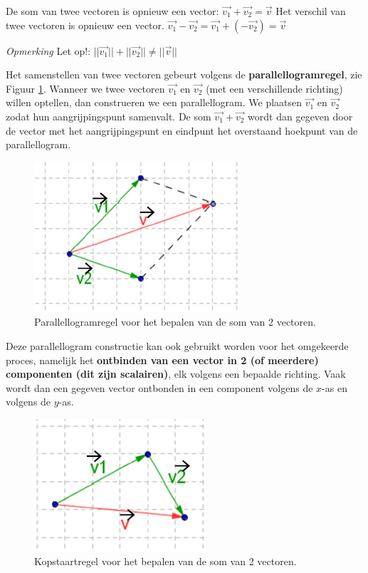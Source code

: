 \begin{definitie}
De som van twee vectoren is opnieuw een vector: $\vec{v_1}+\vec{v_2}=\vec{v}$
Het verschil van twee vectoren is opnieuw een vector. $\vec{v_1}-\vec{v_2}=\vec{v_1}+(-\vec{v_2})=\vec{v}$
\end{definitie}

\emph{Opmerking}
Let op!: $||\vec{v_1}||+||\vec{v_2}|| \ne ||\vec{v}||$


Het samenstellen van twee vectoren gebeurt volgens de \textbf{parallellogramregel}, zie Figuur \ref{fig:som_par}. Wanneer we twee vectoren $\vec{v_1}$ en $\vec{v_2}$ (met een verschillende richting) willen optellen, dan construeren we een parallellogram. We plaatsen $\vec{v_1}$ en $\vec{v_2}$ zodat hun aangrijpingspunt samenvalt. De som $\vec{v_1}+\vec{v_2}$ wordt dan gegeven door de vector met het aangrijpingspunt en eindpunt het overstaand hoekpunt van de parallellogram.

\begin{figure}
	\centering
	\includegraphics[width=0.5\linewidth]{1_elem_rekenvaardigheden_A/inputs/parRegelSom}
	\caption{Parallellogramregel voor het bepalen van de som van 2 vectoren.}
	\label{fig:som_par}
\end{figure}


Deze parallellogram constructie kan ook gebruikt worden voor het omgekeerde proces, namelijk het \textbf{ontbinden van een vector in 2 (of meerdere) componenten (dit zijn scalairen)}, elk volgens een bepaalde richting. Vaak wordt dan een gegeven vector ontbonden in een component volgens de $x$-as en volgens de $y$-as.

\begin{figure}
	\centering
	\includegraphics[width=0.5\linewidth]{1_elem_rekenvaardigheden_A/inputs/kopstaart}
	\caption{Kopstaartregel voor het bepalen van de som van 2 vectoren.}
	\label{fig:kopstaart}
\end{figure}


